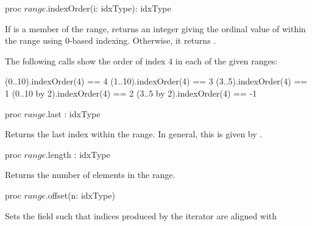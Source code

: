 \begin{protohead}
proc $range$.indexOrder(i: idxType): idxType
\end{protohead}
\begin{protobody}
If  is a member of the range, returns an integer giving
the ordinal value of  within the range using 0-based indexing.
Otherwise, it returns .
\end{protobody}

\begin{example}
The following calls show the order of index 4 in each of the given
ranges:
\begin{chapel}
(0..10).indexOrder(4) == 4
(1..10).indexOrder(4) == 3
(3..5).indexOrder(4) == 1
(0..10 by 2).indexOrder(4) == 2
(3..5 by 2).indexOrder(4) == -1
\end{chapel}
\end{example}
\begin{protohead}

proc $range$.last : idxType
\end{protohead}
\begin{protobody}
Returns the last index within the range.  In general, this is given
by .
\end{protobody}

\begin{protohead}
proc $range$.length : idxType
\end{protohead}
\begin{protobody}
Returns the number of elements in the range.
\end{protobody}

\label{Range_Offset_Method}
\begin{protohead}
proc $range$.offset(n: idxType)
\end{protohead}
\begin{protobody}
Sets the  field such that indices produced by the iterator are
aligned with 
\end{protobody}

